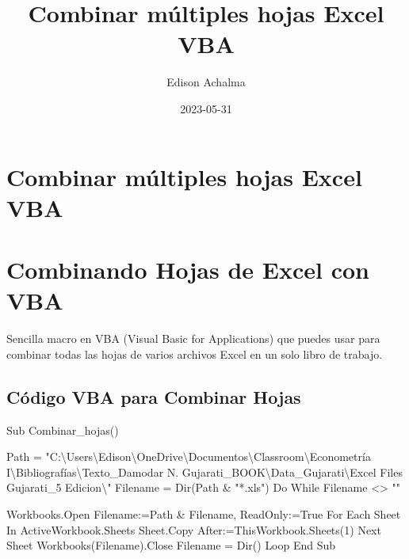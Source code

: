 \documentclass[
  jou,
  floatsintext,
  longtable,
  a4paper,
  nolmodern,
  notxfonts,
  notimes,
  12pt,
  colorlinks=true,linkcolor=blue,citecolor=blue,urlcolor=blue]{apa7}
\title{Combinar múltiples hojas Excel VBA}
\author{Edison Achalma}
\affiliation{
{Escuela Profesional de Economía, Universidad Nacional de San Cristóbal
de Huamanga}}
\date{2023-05-31}
\newenvironment{Shaded}{\begin{snugshade}}{\end{snugshade}}
\newcommand{\NormalTok}[1]{\textcolor[rgb]{0.00,0.23,0.31}{#1}}
\begin{document}
\maketitle


\hypertarget{toc}{}
\tableofcontents
\newpage
\section[Introduction]{Combinar múltiples hojas Excel VBA}

\setcounter{secnumdepth}{3}

\setlength\LTleft{0pt}




\section{Combinando Hojas de Excel con
VBA}\label{combinando-hojas-de-excel-con-vba}

Sencilla macro en VBA (Visual Basic for Applications) que puedes usar
para combinar todas las hojas de varios archivos Excel en un solo libro
de trabajo.

\subsection{Código VBA para Combinar
Hojas}\label{cuxf3digo-vba-para-combinar-hojas}

\begin{Shaded}
\begin{Highlighting}[]
\NormalTok{Sub Combinar\_hojas()}

\NormalTok{    Path = "C:\textbackslash{}Users\textbackslash{}Edison\textbackslash{}OneDrive\textbackslash{}Documentos\textbackslash{}Classroom\textbackslash{}Econometría I\textbackslash{}Bibliografías\textbackslash{}Texto\_Damodar N. Gujarati\_BOOK\textbackslash{}Data\_Gujarati\textbackslash{}Excel Files Gujarati\_5 Edicion\textbackslash{}"}
\NormalTok{    Filename = Dir(Path \& "*.xls")}
\NormalTok{    Do While Filename \textless{}\textgreater{} ""}
    
\NormalTok{        Workbooks.Open Filename:=Path \& Filename, ReadOnly:=True}
\NormalTok{        For Each Sheet In ActiveWorkbook.Sheets}
\NormalTok{            Sheet.Copy After:=ThisWorkbook.Sheets(1)}
\NormalTok{        Next Sheet}
\NormalTok{        Workbooks(Filename).Close}
\NormalTok{        Filename = Dir()}
\NormalTok{    Loop}
\NormalTok{End Sub}
\end{Highlighting}
\end{Shaded}
\end{document}
